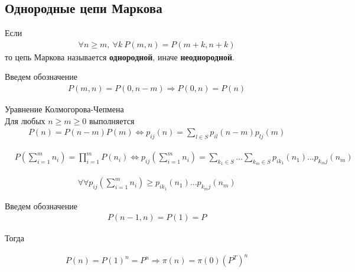\subsection{Однородные цепи Маркова}
\begin{Def}
    Если
    \begin{align*}
      & \forall n\geq m, \ \forall k \ P(m,n) = P(m+k, n+k)
    \end{align*}
    то цепь Маркова называется \textbf{однородной}, иначе \textbf{неоднородной}.
\end{Def}
\begin{Des}
    Введем обозначение
    \begin{align*}
      & P(m,n) = P(0, n-m) \Rightarrow P(0,n) = P(n)
    \end{align*}
\end{Des}
\begin{theorem} Уравнение Колмогорова-Чепмена
    \\
    Для любых $n \geq m \geq 0$ выполняется
    \begin{align*}
      & P(n) = P(n-m)P(m) \Leftrightarrow p_{ij}(n) = \sum_{l \in S}p_{il}(n-m)p_{lj}(m)
    \end{align*}
\end{theorem}
\begin{corollary}
    \begin{align*}
      & P\left( \sum_{i=1}^m n_i \right) = \prod_{i=1}^m P(n_i) \Leftrightarrow p_{ij}\left( \sum_{i=1}^m n_i \right) = \sum_{k_1 \in S}\dots \sum_{k_m \in S} p_{ik_1}(n_1)\dots p_{k_m j}(n_m)
    \end{align*}
\end{corollary}
\begin{Note}
    \begin{align*}
      & \forall \forall p_{ij}\left( \sum_{i=1}^m n_i \right) \geq p_{ik_1}(n_1)\dots p_{k_m j}(n_m)
    \end{align*}
\end{Note}
\begin{Des}
    Введем обозначение
    \begin{align*}
      & P(n-1,n) = P(1) = P
    \end{align*}
\end{Des}
Тогда
\begin{theorem}
    \begin{align*}
      & P(n) = P(1)^n = P^n \Rightarrow \pi(n) = \pi(0)\left( P^T \right)^n
    \end{align*}
\end{theorem}
